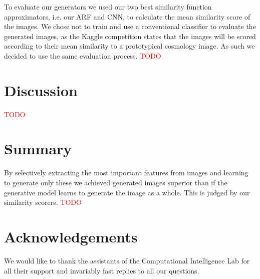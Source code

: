 \documentclass[10pt,conference,compsocconf]{IEEEtran}
\newcommand\TODO[1]{\textcolor{red}{#1}} %
\begin{document}
To evaluate our generators we used our two best similarity function approximators, i.e. our ARF and CNN, to calculate the mean similarity score of the images. We chose not to train and use a conventional classifier to evaluate the generated images, as the Kaggle competition states that the images will be scored according to their mean similarity to a prototypical cosmology image. As such we decided to use the same evaluation process.
\TODO{TODO}



\section{Discussion}
\TODO{TODO}

\section{Summary}
By selectively extracting the most important features from images and learning to generate only these we achieved generated images superior than if the generative model learns to generate the image as a whole. This is judged by our similarity scorers.
\TODO{TODO}



\section*{Acknowledgements}
We would like to thank the assistants of the Computational Intelligence Lab for all their support and invariably fast replies to all our questions.




\end{document}
